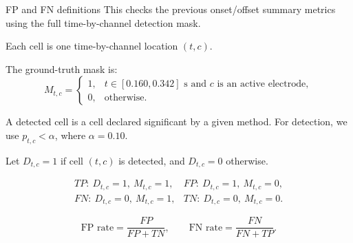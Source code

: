 \documentclass{beamer}
\begin{document}
\begin{frame}{FP and FN definitions}
\scriptsize
This checks the previous onset/offset summary metrics using the full
time-by-channel detection mask.

\smallskip
Each cell is one time-by-channel location $(t,c)$.

The ground-truth mask is:
\[
M_{t,c} =
\begin{cases}
1, & t \in [0.160, 0.342]\text{ s and }c\text{ is an active electrode},\\
0, & \text{otherwise}.
\end{cases}
\]

\smallskip
A detected cell is a cell declared significant by a given method.
For detection, we use $p_{t,c}<\alpha$, where $\alpha = 0.10$.

\smallskip
Let $D_{t,c}=1$ if cell $(t,c)$ is detected, and $D_{t,c}=0$ otherwise.

\[
\begin{array}{ll}
TP:\ D_{t,c}=1,\ M_{t,c}=1, & FP:\ D_{t,c}=1,\ M_{t,c}=0,\\
FN:\ D_{t,c}=0,\ M_{t,c}=1, & TN:\ D_{t,c}=0,\ M_{t,c}=0.
\end{array}
\]

\[
\text{FP rate} = \frac{FP}{FP + TN},
\qquad
\text{FN rate} = \frac{FN}{FN + TP}.
\]
\end{frame}
\end{document}
